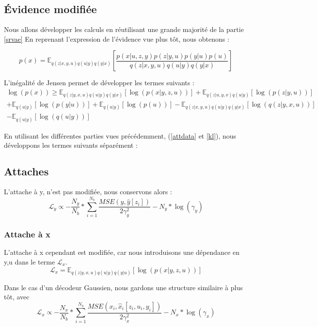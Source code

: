 \documentclass{article}
\begin{document}
\subsection{Évidence modifiée}

Nous allons développer les calculs en réutilisant une grande majorité de la partie \ref{srvae}
En reprenant l'expression de l'évidence vue plus tôt, nous obtenons :

\begin{equation*}
    p(x) = \mathbb{E}_{q(z|x,y,u)q(u|y)q(y|x)}\left[\frac{p(x|u,z,y)p(z|y,u)p(y|u)p(u)}{q(z|x,y,u)q(u|y)q(y|x)}\right]
\end{equation*}

L'inégalité de Jensen permet de développer les termes suivants :
\begin{multline}
    \log(p(x)) \geq \mathbb{E}_{q(z|y,x,u)q(u|y)q(y|x)}\left[\log(p(x|y,z,u))\right] + \mathbb{E}_{q(z|u,y,x)q(u|y)}\left[\log(p(z|y,u))\right] \\+ \mathbb{E}_{q(u|y)}\left[\log(p(y|u))\right] + \mathbb{E}_{q(u|y)}\left[\log(p(u))\right] - \mathbb{E}_{q(z|x,y,u)q(u|y)q(y|x)}\left[\log(q(z|y,x,u))\right]\\ - \mathbb{E}_{q(u|y)}\left[\log(q(u|y))\right]
\end{multline}

En utilisant les différentes parties vues précédemment, (\ref{attdata} et \ref{kl}), nous développons les termes suivants séparément : 

\subsection{Attaches}
L'attache à y, n'est pas modifiée, nous conservons alors :
\begin{equation*}
    \mathcal{L}_y \propto -\frac{N_y}{N_b}*\sum_{i=1}^{N_b}\frac{MSE(y,\hat{y}[z_i])}{2\gamma_y^2} - N_y*\log(\gamma_y)
\end{equation*}
\subsubsection{Attache à x}
L'attache à x cependant est modifiée, car nous introduisons une dépendance en y,u dans le terme $ \mathcal{L}_x$.
\begin{equation*}
     \mathcal{L}_x = \mathbb{E}_{q(z|y,x,u)q(u|y)q(y|u)}\left[\log(p(x|y,z,u))\right]
\end{equation*}

Dans le cas d'un décodeur Gaussien, nous gardons une structure similaire à plus tôt, avec 
\begin{equation*}
        \mathcal{L}_x \propto -\frac{N_x}{N_b}*\sum_{i=1}^{N_b}\frac{MSE(x_i,\hat{x}_i[z_i,u_i,y_i])}{2\gamma_x^2} - N_x*\log(\gamma_x)
\end{equation*}
\end{document}
